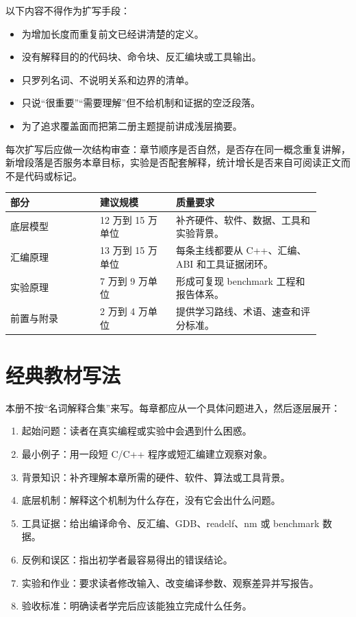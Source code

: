 以下内容不得作为扩写手段：

\begin{itemize}
  \item 为增加长度而重复前文已经讲清楚的定义。
  \item 没有解释目的的代码块、命令块、反汇编块或工具输出。
  \item 只罗列名词、不说明关系和边界的清单。
  \item 只说“很重要”“需要理解”但不给机制和证据的空泛段落。
  \item 为了追求覆盖面而把第二册主题提前讲成浅层摘要。
\end{itemize}

每次扩写后应做一次结构审查：章节顺序是否自然，是否存在同一概念重复讲解，新增段落是否服务本章目标，实验是否配套解释，统计增长是否来自可阅读正文而不是代码或标记。

\begin{center}
\begin{tabular}{p{0.26\linewidth}p{0.22\linewidth}p{0.42\linewidth}}
\toprule
部分 & 建议规模 & 质量要求 \\
\midrule
底层模型 & 12 万到 15 万单位 & 补齐硬件、软件、数据、工具和实验背景。 \\
汇编原理 & 13 万到 15 万单位 & 每条主线都要从 C++、汇编、ABI 和工具证据闭环。 \\
实验原理 & 7 万到 9 万单位 & 形成可复现 benchmark 工程和报告体系。 \\
前置与附录 & 2 万到 4 万单位 & 提供学习路线、术语、速查和评分标准。 \\
\bottomrule
\end{tabular}
\end{center}

\section*{经典教材写法}

本册不按“名词解释合集”来写。每章都应从一个具体问题进入，然后逐层展开：

\begin{enumerate}
  \item 起始问题：读者在真实编程或实验中会遇到什么困惑。
  \item 最小例子：用一段短 C/C++ 程序或短汇编建立观察对象。
  \item 背景知识：补齐理解本章所需的硬件、软件、算法或工具背景。
  \item 底层机制：解释这个机制为什么存在，没有它会出什么问题。
  \item 工具证据：给出编译命令、反汇编、GDB、readelf、nm 或 benchmark 数据。
  \item 反例和误区：指出初学者最容易得出的错误结论。
  \item 实验和作业：要求读者修改输入、改变编译参数、观察差异并写报告。
  \item 验收标准：明确读者学完后应该能独立完成什么任务。
\end{enumerate}

